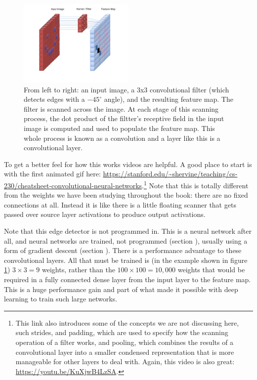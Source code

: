 \begin{figure}[h]
\centering
\includegraphics[width=0.5\textwidth]{images/CNN_Filter.png}
\caption[User Cecbur, \url{https://commons.wikimedia.org/wiki/File:Convolutional_Neural_Network_NeuralNetworkFilter.gif}, with labels added by Jeff Yoshimi.]{From left to right: an input image, a 3x3 convolutional filter (which detects edges with a $-45^\circ$ angle), and the resulting feature map. The filter is scanned across the image. At each stage of this scanning process, the dot product of the filtter's receptive field in the input image is computed and used to populate the feature map. This whole process is known as a convolution and a layer like this is a convolutional layer.}
\label{cnn_filter}
\end{figure}

To get a better feel for how this works videos are  helpful. A good place  to start is with the first animated gif here: \url{https://stanford.edu/~shervine/teaching/cs-230/cheatsheet-convolutional-neural-networks}.\footnote{This link also introduces some of the concepts we are not discussing here, such strides, and padding, which are used to specify how the scanning operation of a filter works, and pooling, which combines the results of a convolutional layer into a smaller  condensed representation that is more manageable for other layers to deal with. Again, this video is also great: \url{https://youtu.be/KuXjwB4LzSA}.} Note that this is totally different from the weights we have been studying throughout the book: there are no fixed connections at all. Instead it is like there is a little floating scanner that gets passed over source layer activations to produce output activations.

Note that this edge detector is not programmed in. This is a neural network after all, and neural networks are trained, not programmed (section ), usually using a form of gradient descent (section ). There is a performance advantage to these convolutional layers. All that must be trained is (in the example shown in figure \ref{cnn_filter}) $3 \times 3=9$ weights, rather than the $100 \times 100 = 10,000$ weights that would be required in a fully connected dense layer from the input layer to the feature map. This is a huge performance gain and part of what  made it possible with deep learning to train such large networks.


